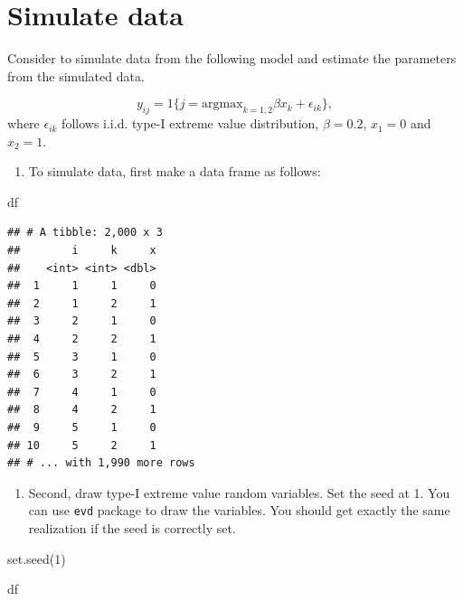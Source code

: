 \documentclass[
]{book}
\newenvironment{Shaded}{\begin{snugshade}}{\end{snugshade}}
\newcommand{\DecValTok}[1]{\textcolor[rgb]{0.00,0.00,0.81}{#1}}
\newcommand{\FunctionTok}[1]{\textcolor[rgb]{0.00,0.00,0.00}{#1}}
\newcommand{\NormalTok}[1]{#1}
\providecommand{\tightlist}{%
  \setlength{\itemsep}{0pt}\setlength{\parskip}{0pt}}
\begin{document}
\hypertarget{simulate-data}{%
\section{Simulate data}\label{simulate-data}}

Consider to simulate data from the following model and estimate the parameters from the simulated data.

\[
y_{ij} = 1\{j = \text{argmax}_{k = 1, 2} \beta x_k + \epsilon_{ik} \},
\]
where \(\epsilon_{ik}\) follows i.i.d. type-I extreme value distribution, \(\beta = 0.2\), \(x_1 = 0\) and \(x_2 = 1\).

\begin{enumerate}
\def\labelenumi{\arabic{enumi}.}
\tightlist
\item
  To simulate data, first make a data frame as follows:
\end{enumerate}

\begin{Shaded}
\begin{Highlighting}[]
\NormalTok{df}
\end{Highlighting}
\end{Shaded}

\begin{verbatim}
## # A tibble: 2,000 x 3
##        i     k     x
##    <int> <int> <dbl>
##  1     1     1     0
##  2     1     2     1
##  3     2     1     0
##  4     2     2     1
##  5     3     1     0
##  6     3     2     1
##  7     4     1     0
##  8     4     2     1
##  9     5     1     0
## 10     5     2     1
## # ... with 1,990 more rows
\end{verbatim}

\begin{enumerate}
\def\labelenumi{\arabic{enumi}.}
\setcounter{enumi}{1}
\tightlist
\item
  Second, draw type-I extreme value random variables. Set the seed at 1. You can use \texttt{evd} package to draw the variables. You should get exactly the same realization if the seed is correctly set.
\end{enumerate}

\begin{Shaded}
\begin{Highlighting}[]
\FunctionTok{set.seed}\NormalTok{(}\DecValTok{1}\NormalTok{)}
\end{Highlighting}
\end{Shaded}

\begin{Shaded}
\begin{Highlighting}[]
\NormalTok{df}
\end{Highlighting}
\end{Shaded}
\end{document}
